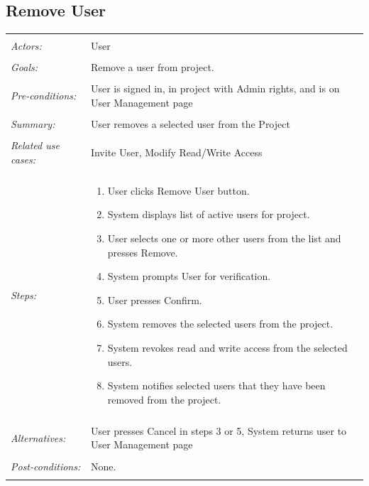 \documentclass[11pt]{report}
\begin{document}
\subsection{Remove User}
\begin{tabular}{ p{2cm} p{12cm} }
    \hline
    \\
    \textit{Actors:} & User \\ 
    \\
    \textit{Goals:} & Remove a user from project. \\
    \\
    \textit{Pre-conditions:} & User is signed in, in project with Admin rights, and is on User Management page\\
    \\
    \textit{Summary:} & User removes a selected user from the Project \\ 
    \\
    \textit{Related use cases:} & Invite User, Modify Read/Write Access \\ 
    \\
    \textit{Steps:} & \begin{enumerate}
        \item User clicks Remove User button.
        \item System displays list of active users for project.
        \item User selects one or more other users from the list and presses Remove.
        \item System prompts User for verification.
        \item User presses Confirm.
        \item System removes the selected users from the project.
        \item System revokes read and write access from the selected users.
        \item System notifies selected users that they have been removed from the project.
    \end{enumerate} \\
    \\
    \textit{Alternatives:} & User presses Cancel in steps 3 or 5, System returns user to User Management page \\
    \\
    \textit{Post-conditions:} & None. \\
    \\
    \hline
\end{tabular}
\end{document}
